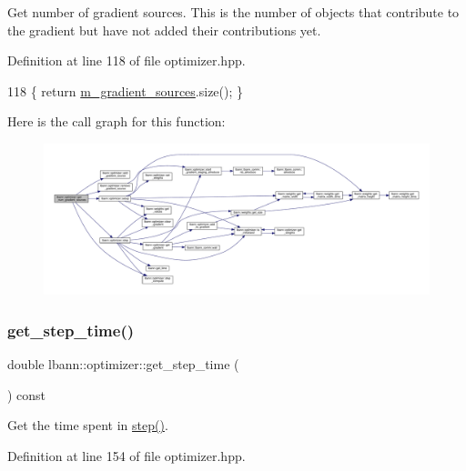 Get number of gradient sources. This is the number of objects that contribute to the gradient but have not added their contributions yet. 

Definition at line 118 of file optimizer.\+hpp.


\begin{DoxyCode}
118 \{ \textcolor{keywordflow}{return} \hyperlink{classlbann_1_1optimizer_aadfa322a683c2b826d0fae5f809298df}{m\_gradient\_sources}.size(); \}
\end{DoxyCode}
Here is the call graph for this function\+:\nopagebreak
\begin{figure}[H]
\begin{center}
\leavevmode
\includegraphics[width=350pt]{classlbann_1_1optimizer_a91370e4de6083e7cd464c809cf583eb3_cgraph}
\end{center}
\end{figure}
\mbox{\label{classlbann_1_1optimizer_afef81d54e836ba0177f7a411ba3aaf6e}} 
\subsubsection{\texorpdfstring{get\+\_\+step\+\_\+time()}{get\_step\_time()}}
{\footnotesize\ttfamily double lbann\+::optimizer\+::get\+\_\+step\+\_\+time (\begin{DoxyParamCaption}{ }\end{DoxyParamCaption}) const\hspace{0.3cm}{\ttfamily [inline]}}

Get the time spent in \hyperlink{classlbann_1_1optimizer_aa9f43ca3f22edc0a25d0509b6514a411}{step()}. 

Definition at line 154 of file optimizer.\+hpp.


